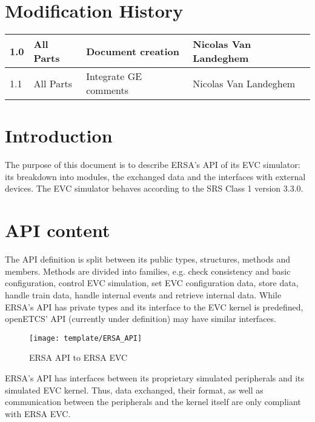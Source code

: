 \documentclass{template/openetcs_article}
\begin{document}
\section*{Modification History}
\begin{supertabular}{| m{1.2cm} | m{1.2cm} | m{6.6cm} | m{4cm} |}
 1.0 &All Parts &Document creation &Nicolas Van Landeghem \\ &All Parts &Integrate GE comments &Nicolas Van Landeghem \\\hline
\end{supertabular}


\tableofcontents
\newpage




\section{Introduction}
The purpose of this document is to describe ERSA's API of its EVC simulator: its breakdown into modules, the exchanged data and the interfaces with external devices. The EVC simulator behaves according to the SRS Class 1 version 3.3.0.
\newline
\newpage
\section{API content}
The API definition is split between its public types, structures, methods and members. Methods are divided into families, e.g. check consistency and basic configuration, control EVC simulation, set EVC configuration data, store data, handle train data, handle internal events and retrieve internal data.
\newline While ERSA's API has private types and its interface to the EVC kernel is predefined, openETCS' API (currently under definition) may have similar interfaces. 

\begin{figure}[!h]
  \centering
  \texttt{[image: template/ERSA\_API]}
  \caption{ERSA API to ERSA EVC}
  \label{fig:ERSA API to ERSA EVC}
\end{figure}
ERSA's API has interfaces between its proprietary simulated peripherals and its simulated EVC kernel. Thus, data exchanged, their format, as well as communication between the peripherals and the kernel itself are only compliant with ERSA EVC.
\end{document}
